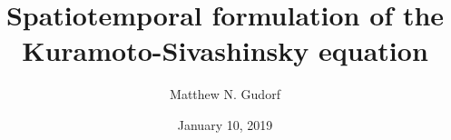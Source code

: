 \documentclass[reqno,11pt,oneside]{article}
\begin{document}
\title{Spatiotemporal formulation of the Kuramoto-Sivashinsky equation}
\author{Matthew N. Gudorf}
\date{January 10, 2019} %
\maketitle

\begin{abstract}

\end{abstract}





\newpage
\end{document}
